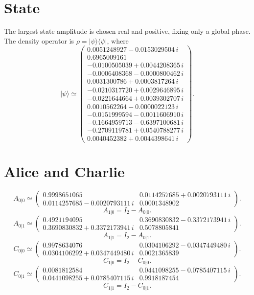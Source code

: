 \documentclass[11pt]{article}
\begin{document}
\section{State}
The largest state amplitude is chosen real and positive, fixing only a
global phase. The density operator is $\rho=|\psi\rangle\langle\psi|$, where
\[
|\psi\rangle\simeq
\begin{pmatrix}
0.0051248927-0.0153029504\,i \\
0.6965009161 \\
-0.0100505039+0.0044208365\,i \\
-0.0006408368-0.0000800462\,i \\
0.0031300786+0.0003817264\,i \\
-0.0210317720+0.0029646895\,i \\
-0.0221644664+0.0039302707\,i \\
0.0010562264-0.0000022123\,i \\
-0.0151999594-0.0011606910\,i \\
-0.1664959713-0.6397100681\,i \\
-0.2709119781+0.0540788277\,i \\
0.0040452382+0.0044398641\,i
\end{pmatrix}.
\]
\section{Alice and Charlie}
\[
A_{0|0}\simeq \begin{pmatrix}
0.9998651065 & 0.0114257685+0.0020793111\,i \\
0.0114257685-0.0020793111\,i & 0.0001348902
\end{pmatrix}.
\]
\[
A_{1|0}=I_2-A_{0|0}.
\]
\[
A_{0|1}\simeq \begin{pmatrix}
0.4921194095 & 0.3690830832-0.3372173941\,i \\
0.3690830832+0.3372173941\,i & 0.5078805841
\end{pmatrix}.
\]
\[
A_{1|1}=I_2-A_{0|1}.
\]
\[
C_{0|0}\simeq \begin{pmatrix}
0.9978634076 & 0.0304106292-0.0347449480\,i \\
0.0304106292+0.0347449480\,i & 0.0021365839
\end{pmatrix}.
\]
\[
C_{1|0}=I_2-C_{0|0}.
\]
\[
C_{0|1}\simeq \begin{pmatrix}
0.0081812584 & 0.0441098255-0.0785407115\,i \\
0.0441098255+0.0785407115\,i & 0.9918187454
\end{pmatrix}.
\]
\[
C_{1|1}=I_2-C_{0|1}.
\]
\end{document}
